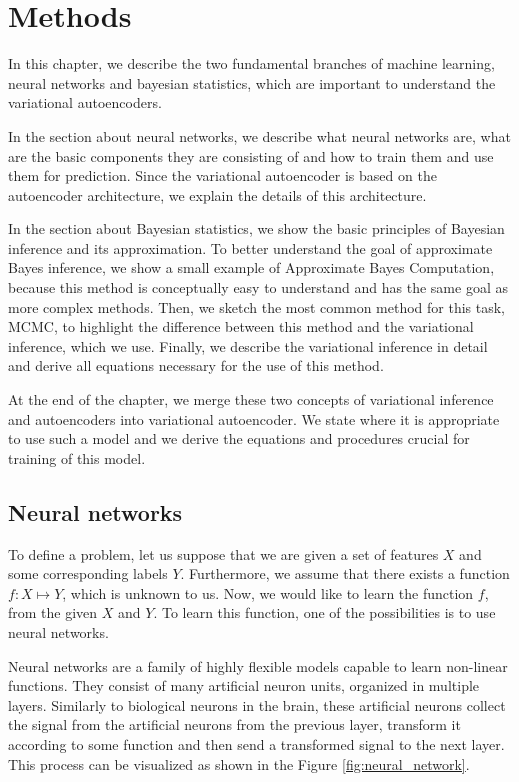 \chapter{Methods}
\label{chap:methods}

In this chapter, we describe the two fundamental branches of machine learning, neural networks and bayesian statistics, which are important to understand the variational autoencoders.

In the section about neural networks, we describe what neural networks are, what are the basic components they are consisting of and how to train them and use them for prediction.
Since the variational autoencoder is based on the autoencoder architecture, we explain the details of this architecture.

In the section about Bayesian statistics, we show the basic principles of Bayesian inference and its approximation.
To better understand the goal of approximate Bayes inference, we show a small example of Approximate Bayes Computation, because this method is conceptually easy to understand and has the same goal as more complex methods.
Then, we sketch the most common method for this task, MCMC, to highlight the difference between this method and the variational inference, which we use.
Finally, we describe the variational inference in detail and derive all equations necessary for the use of this method.

At the end of the chapter, we merge these two concepts of variational inference and autoencoders into variational autoencoder.
We state where it is appropriate to use such a model and we derive the equations and procedures crucial for training of this model.

\section{Neural networks}
\label{sec:nn}
To define a problem, let us suppose that we are given a set of features $X$ and some corresponding labels $Y$.
Furthermore, we assume that there exists a function $f: X \mapsto Y$, which is unknown to us.
Now, we would like to learn the function $f$, from the given $X$ and $Y$.
To learn this function, one of the possibilities is to use neural networks.

Neural networks are a family of highly flexible models capable to learn non-linear functions.
They consist of many artificial neuron units, organized in multiple layers.
Similarly to biological neurons in the brain, these artificial neurons collect the signal from the artificial neurons from the previous layer, transform it according to some function and then send a transformed signal to the next layer.
This process can be visualized as shown in the Figure \ref{fig:neural_network}.

